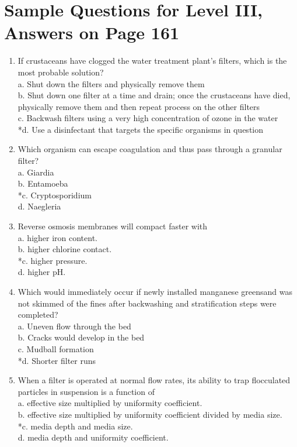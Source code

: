 \section{Sample Questions for Level III, Answers on Page 161}
\begin{enumerate}[label=TIII-\arabic*]
  \item If crustaceans have clogged the water treatment plant's filters, which is the most probable solution?\\
a. Shut down the filters and physically remove them\\
b. Shut down one filter at a time and drain; once the crustaceans have died, physically remove them and then repeat process on the other filters\\
c. Backwash filters using a very high concentration of ozone in the water\\
*d. Use a disinfectant that targets the specific organisms in question\\
  \item Which organism can escape coagulation and thus pass through a granular filter?\\
a. Giardia\\
b. Entamoeba\\
*c. Cryptosporidium\\
d. Naegleria\\
  \item Reverse osmosis membranes will compact faster with\\
a. higher iron content.\\
b. higher chlorine contact.\\
*c. higher pressure.\\
d. higher pH.\\
  \item Which would immediately occur if newly installed manganese greensand was not skimmed of the fines after backwashing and stratification steps were completed?\\
a. Uneven flow through the bed\\
b. Cracks would develop in the bed\\
c. Mudball formation\\
*d. Shorter filter runs \\
\item When a filter is operated at normal flow rates, its ability to trap flocculated particles in suspension is a function of\\
a. effective size multiplied by uniformity coefficient.\\
b. effective size multiplied by uniformity coefficient divided by media size.\\
*c. media depth and media size.\\
d. media depth and uniformity coefficient.\\
\end{enumerate}
